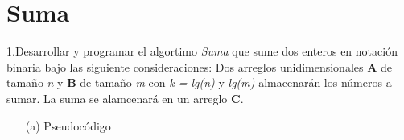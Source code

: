 \section{Suma}
1.Desarrollar y programar el algortimo \textit{Suma} que sume dos enteros en notación binaria bajo las siguiente consideraciones: Dos arreglos unidimensionales \textbf{A} de tamaño \textit{n} y \textbf{B} de tamaño \textit{m} con \textit{k = lg(n)} y \textit{lg(m)} almacenarán los números a sumar. La suma se alamcenará en un arreglo \textbf{C}.

\begin{itemize}
	\item[(a)] Pseudocódigo
		
\end{itemize}